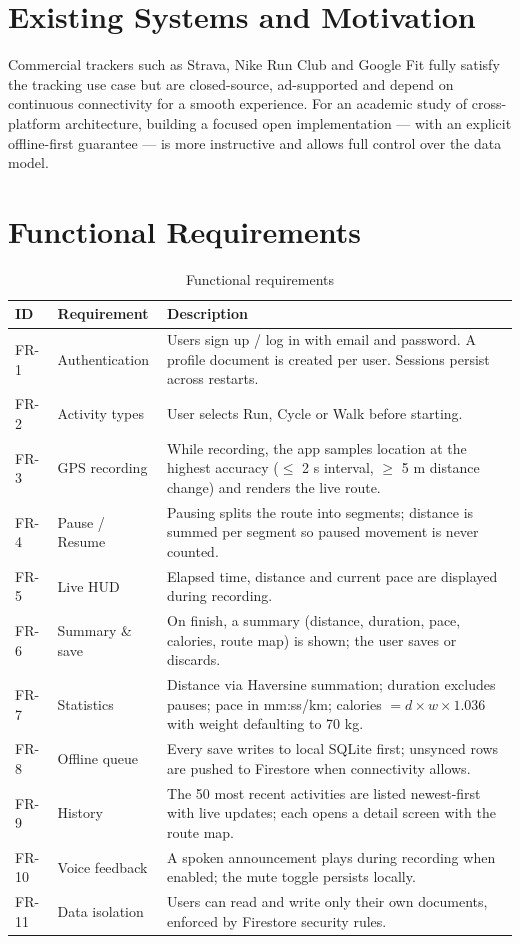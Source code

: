 \documentclass[11pt,a4paper]{report}
\begin{document}
\section{Existing Systems and Motivation}
Commercial trackers such as Strava, Nike Run Club and Google Fit fully satisfy the tracking use case but are closed-source, ad-supported and depend on continuous connectivity for a smooth experience. For an academic study of cross-platform architecture, building a focused open implementation --- with an explicit offline-first guarantee --- is more instructive and allows full control over the data model.

\section{Functional Requirements}
\begin{longtable}{p{1.2cm} p{5.6cm} p{8.2cm}}
\caption{Functional requirements}\label{tab:frs}\\
\toprule
\textbf{ID} & \textbf{Requirement} & \textbf{Description} \\
\midrule
\endhead
FR-1 & Authentication & Users sign up / log in with email and password. A profile document is created per user. Sessions persist across restarts. \\
FR-2 & Activity types & User selects Run, Cycle or Walk before starting. \\
FR-3 & GPS recording & While recording, the app samples location at the highest accuracy ($\le$ 2 s interval, $\ge$ 5 m distance change) and renders the live route. \\
FR-4 & Pause / Resume & Pausing splits the route into segments; distance is summed per segment so paused movement is never counted. \\
FR-5 & Live HUD & Elapsed time, distance and current pace are displayed during recording. \\
FR-6 & Summary \& save & On finish, a summary (distance, duration, pace, calories, route map) is shown; the user saves or discards. \\
FR-7 & Statistics & Distance via Haversine summation; duration excludes pauses; pace in mm:ss/km; calories $= d \times w \times 1.036$ with weight defaulting to 70 kg. \\
FR-8 & Offline queue & Every save writes to local SQLite first; unsynced rows are pushed to Firestore when connectivity allows. \\
FR-9 & History & The 50 most recent activities are listed newest-first with live updates; each opens a detail screen with the route map. \\
FR-10 & Voice feedback & A spoken announcement plays during recording when enabled; the mute toggle persists locally. \\
FR-11 & Data isolation & Users can read and write only their own documents, enforced by Firestore security rules. \\
\bottomrule
\end{longtable}
\end{document}
